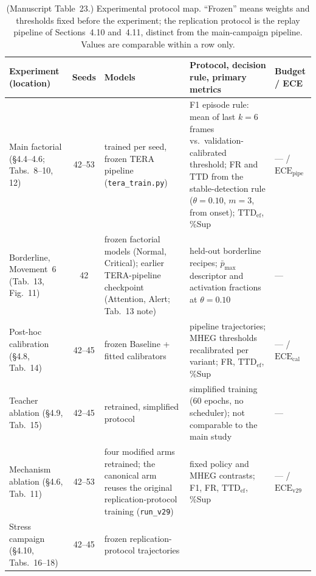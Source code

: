 \documentclass[1p,12pt,authoryear]{elsarticle}
\providecommand{\revcolor}{black}%
\providecommand{\MHEG}{\mbox{MHEG}\xspace}
\begin{document}
\begin{table}[!tbp]
\color{\revcolor}
\centering
\setcounter{table}{22}%
\caption{(Manuscript Table~23.) Experimental protocol map. ``Frozen'' means weights and thresholds
fixed before the experiment; the replication protocol is the replay pipeline
of Sections~4.10 and~4.11,
distinct from the main-campaign pipeline. Values are comparable within a row
only.}

\scriptsize
\setlength{\tabcolsep}{2.8pt}
\renewcommand{\arraystretch}{1.18}
\begin{tabularx}{\textwidth}{>{\raggedright\arraybackslash}p{2.7cm}
  c >{\raggedright\arraybackslash}p{3.0cm} >{\raggedright\arraybackslash}X
  >{\raggedright\arraybackslash}p{2.4cm}}
\toprule
\textbf{Experiment (location)} & \textbf{Seeds} & \textbf{Models}
  & \textbf{Protocol, decision rule, primary metrics}
  & \textbf{Budget / ECE} \\
\midrule
Main factorial (\S4.4--4.6;
Tabs.~8--10,
12) & 42--53 & trained per seed, frozen TERA pipeline (\texttt{tera\_train.py})
  & F1 episode rule: mean of last $k{=}6$ frames vs.\ validation-calibrated
    threshold; FR and $\mathrm{TTD}$ from the stable-detection rule
    ($\theta{=}0.10$, $m{=}3$, from onset); $\mathrm{TTD}_{\mathrm{ef}}$, \%Sup
  & --- / $\mathrm{ECE}_{\mathrm{pipe}}$ \\
Borderline, Movement~6 (Tab.~13,
Fig.~11) & 42 & frozen factorial models (Normal, Critical); earlier TERA-pipeline checkpoint (Attention, Alert; Tab.~13 note)
  & held-out borderline recipes; $\bar{p}_{\max}$ descriptor and activation
    fractions at $\theta{=}0.10$ & --- \\
Post-hoc calibration (\S4.8,
Tab.~14) & 42--45 & frozen Baseline + fitted
  calibrators & pipeline trajectories; \MHEG thresholds recalibrated per
  variant; FR, $\mathrm{TTD}_{\mathrm{ef}}$, \%Sup
  & --- / $\mathrm{ECE}_{\mathrm{cal}}$ \\
Teacher ablation (\S4.9,
Tab.~15) & 42--45 & retrained, simplified protocol
  & simplified training (60 epochs, no scheduler); not comparable to the main
    study & --- \\
Mechanism ablation (\S4.6,
Tab.~11) & 42--53 & four modified arms retrained; the
  canonical arm reuses the original replication-protocol training (\texttt{run\_v29}) & fixed policy and \MHEG contrasts; F1, FR,
  $\mathrm{TTD}_{\mathrm{ef}}$, \%Sup & --- / $\mathrm{ECE}_{\mathrm{v29}}$ \\
Stress campaign (\S4.10,
Tabs.~16--18) & 42--45 & frozen replication-protocol trajectories

\end{tabularx}
\end{table}
\end{document}
